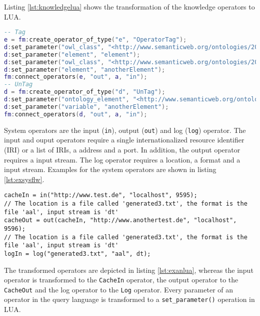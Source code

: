 Listing \ref{lst:knowledgelua} shows the transformation of the knowledge operators
to LUA.
\begin{lstlisting}[language=Lua, caption={\emph{Examples of Knowledge Operators in LUA}},label={lst:knowledgelua}]
-- Tag
e = fm:create_operator_of_type("e", "OperatorTag");
d:set_parameter("owl_class", "<http://www.semanticweb.org/ontologies/2007/7/A.owl#Class1186574909930821000>");
d:set_parameter("element", "element");
d:set_parameter("owl_class", "<http://www.semanticweb.org/ontologies/2007/7/A.owl#Class1186574918251108000>");
d:set_parameter("element", "anotherElement");
fm:connect_operators(e, "out", a, "in");
-- UnTag
d = fm:create_operator_of_type("d", "UnTag");
d:set_parameter("ontology_element", "<http://www.semanticweb.org/ontologies/2007/7/A.owl#Class1186574909930821000>");
d:set_parameter("variable", "anotherElement");
fm:connect_operators(d, "out", a, "in");
\end{lstlisting}
System operators are the input (\texttt{in}), output (\texttt{out}) and log
(\texttt{log}) operator. The input and ouput operators require a single 
internationalized resource identifier (IRI) or a list of IRIs, a address and a 
port. In addition, the output operator requires a input stream. The log operator
requires a location, a format and a input stream. Examples for the system 
operators are shown in listing \ref{lst:exsysflw}.
\begin{lstlisting}[language=Flow, caption={\emph{Examples of System Operators in Flow}},label={lst:exsysflw}]
cacheIn = in("http://www.test.de", "localhost", 9595);
// The location is a file called 'generated3.txt', the format is the file 'aal', input stream is 'dt'
cacheOut = out(cacheIn, "http://www.anothertest.de", "localhost", 9596);
// The location is a file called 'generated3.txt', the format is the file 'aal', input stream is 'dt'
logIn = log("generated3.txt", "aal", dt);
\end{lstlisting}
The transformed operators are depicted in listing \ref{lst:exanlua}, whereas the
input operator is transformed to the \texttt{CacheIn} operator, the output operator 
to the \texttt{CacheOut} and the log operator to the \texttt{Log} operator. Every
parameter of an operator in the query language is transformed to a \texttt{set\_parameter()}
operation in LUA.

